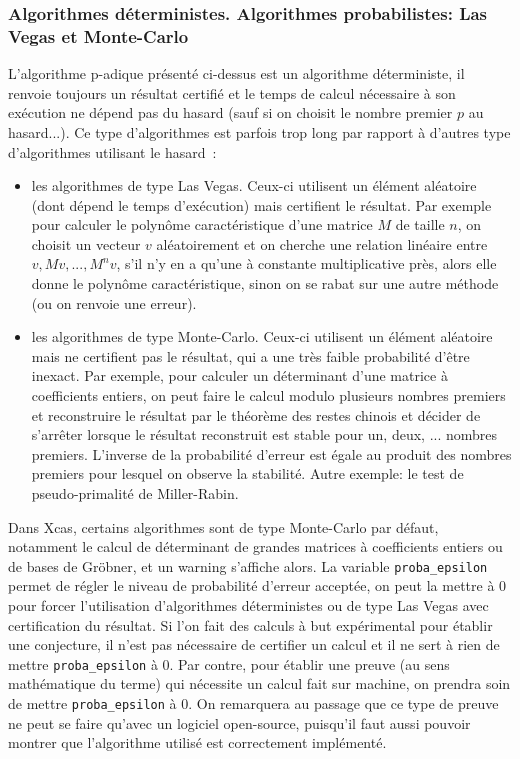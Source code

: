 \documentclass[a4paper,11pt]{article}
\begin{document}
\begin{giacjshere}
\subsubsection{Algorithmes d\'eterministes. Algorithmes probabilistes: Las Vegas
et Monte-Carlo}
L'algorithme p-adique pr\'esent\'e ci-dessus est un algorithme
d\'eterministe, il renvoie toujours un r\'esultat certifi\'e et 
le temps de calcul n\'ecessaire \`a son ex\'ecution ne d\'epend
pas du hasard (sauf si on choisit le nombre premier $p$ au hasard...).
Ce type d'algorithmes est parfois trop long par rapport 
\`a d'autres type d'algorithmes utilisant le hasard~:
\begin{itemize}
\item les algorithmes de type Las Vegas. Ceux-ci utilisent un 
\'el\'ement al\'eatoire (dont d\'epend le temps d'ex\'ecution) mais
certifient le r\'esultat. Par exemple pour calculer le polyn\^ome
caract\'eristique d'une matrice $M$ de taille $n$, on choisit 
un vecteur $v$ al\'eatoirement
et on cherche une relation lin\'eaire entre $v,Mv,...,M^nv$,
s'il n'y en a qu'une \`a constante multiplicative pr\`es, alors
elle donne le polyn\^ome caract\'eristique, sinon on se rabat
sur une autre m\'ethode (ou on renvoie une erreur).
\item les algorithmes de type Monte-Carlo. Ceux-ci utilisent un
\'el\'ement al\'eatoire mais ne certifient pas le r\'esultat, qui a
une tr\`es faible probabilit\'e d'\^etre inexact. Par exemple,
pour calculer un d\'eterminant d'une matrice \`a coefficients
entiers, on peut faire le calcul modulo plusieurs nombres
premiers et reconstruire le r\'esultat par le th\'eor\`eme
des restes chinois et d\'ecider de s'arr\^eter lorsque
le r\'esultat reconstruit est stable pour un, deux, ... nombres
premiers. L'inverse de la probabilit\'e d'erreur est \'egale
au produit des nombres premiers pour lesquel on observe la
stabilit\'e. Autre exemple: le test de pseudo-primalit\'e
de Miller-Rabin.
\end{itemize}
Dans Xcas, certains algorithmes sont de type Monte-Carlo par
d\'efaut, notamment le calcul de d\'eterminant de grandes matrices
\`a coefficients entiers ou de bases de Gr\"obner, et un warning
s'affiche alors. La variable
\verb|proba_epsilon| permet de r\'egler le niveau de probabilit\'e
d'erreur accept\'ee, on peut la mettre \`a 0 pour forcer l'utilisation
d'algorithmes d\'eterministes ou de type Las Vegas avec certification
du r\'esultat. Si l'on fait des calculs \`a but exp\'erimental pour
\'etablir une conjecture, il n'est pas n\'ecessaire de certifier un
calcul et il ne sert \`a rien de mettre \verb|proba_epsilon| \`a 0.
Par contre, pour \'etablir une preuve (au sens math\'ematique du terme) qui
n\'ecessite un calcul fait sur machine,
on prendra soin de mettre \verb|proba_epsilon| \`a 0. 
On remarquera au passage que ce type de
preuve ne peut se faire qu'avec un logiciel open-source, puisqu'il
faut aussi pouvoir montrer que l'algorithme utilis\'e
est correctement impl\'ement\'e.


\end{giacjshere}
\end{document}
